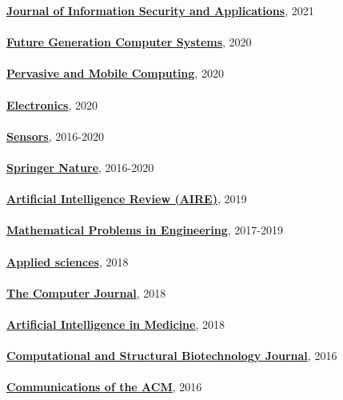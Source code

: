 \href{https://www.journals.elsevier.com/journal-of-information-security-and-applications}{\textbf{Journal of Information Security and Applications}}, 2021
\\ \halfblankline \\
\href{https://www.sciencedirect.com/journal/future-generation-computer-systems}{\textbf{Future Generation Computer Systems}}, 2020
\\ \halfblankline \\
\href{https://www.journals.elsevier.com/pervasive-and-mobile-computing}{\textbf{Pervasive and Mobile Computing}}, 2020
\\ \halfblankline \\
\href{https://www.mdpi.com/journal/electronics}{\textbf{Electronics}}, 2020
\\ \halfblankline \\
\href{http://www.mdpi.com/journal/sensors}{\textbf{Sensors}}, 2016-2020
\\ \halfblankline \\
\href{https://www.springernature.com/gp}{\textbf{Springer Nature}}, 2016-2020
\\ \halfblankline \\
\href{https://link.springer.com/journal/10462}{\textbf{Artificial Intelligence Review (AIRE)}}, 2019
\\ \halfblankline \\
\href{https://www.hindawi.com/journals/mpe/}{\textbf{Mathematical Problems in Engineering}}, 2017-2019
\\ \halfblankline \\
\href{http://www.mdpi.com/journal/applsci}{\textbf{Applied sciences}}, 2018
\\ \halfblankline \\
\href{https://academic.oup.com/comjnl}{\textbf{The Computer Journal}}, 2018
\\ \halfblankline \\
\href{https://www.journals.elsevier.com/artificial-intelligence-in-medicine/}{\textbf{Artificial Intelligence in Medicine}}, 2018
\\ \halfblankline \\
\href{https://www.journals.elsevier.com/computational-and-structural-biotechnology-journal/}{\textbf{Computational and Structural Biotechnology Journal}}, 2016
\\ \halfblankline \\
\href{http://cacm.acm.org/}{\textbf{Communications of the ACM}}, 2016
